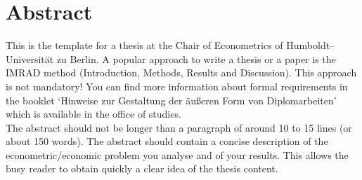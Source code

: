 \section*{Abstract}

This is the template for a thesis at the Chair of Econometrics of
Humboldt--Universit\"at zu Berlin. A popular approach to write a
thesis or a paper is the IMRAD method (Introduction, Methods,
Results and Discussion). This approach is not mandatory! You can
find more information about formal requirements in the booklet
`Hinweise zur Gestaltung der \"au\ss eren Form von Diplomarbeiten'
which is available in the office of studies.\\

The abstract should not be longer than a paragraph of around 10 to
15 lines (or about 150 words). The abstract should contain a
concise description of the econometric/economic problem you
analyse and of your results. This allows the busy reader to obtain
quickly a clear idea of the thesis content.

